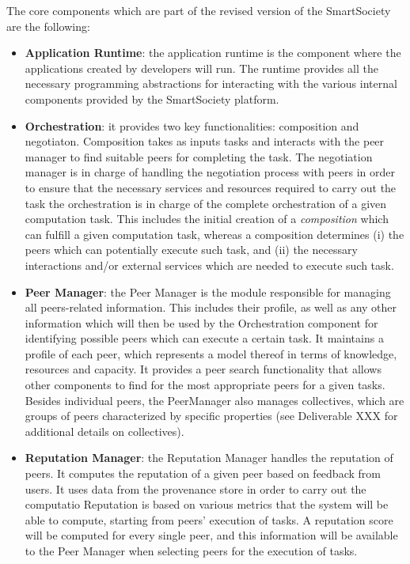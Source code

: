 The core components which are part of the revised version of the SmartSociety are the following:
\begin{itemize}
\item \textbf{Application Runtime}: the application runtime is the component where the applications created by developers will run. The runtime provides all the necessary programming abstractions for interacting with the various internal components provided by the SmartSociety platform. 

\item \textbf{Orchestration}: it provides two key functionalities: composition and negotiaton. Composition takes as
inputs tasks and interacts with the peer manager to find suitable peers for completing the task. The negotiation manager is in charge of handling the negotiation process with peers in order to ensure that
the necessary services and resources required to carry out the task the orchestration is in charge of the complete orchestration of a given computation task. This includes the initial creation of a \textit{composition} which can fulfill a given computation task, whereas a composition determines (i) the peers which can potentially execute such task, and (ii) the necessary interactions and/or external services which are needed to execute such task. 

\item \textbf{Peer Manager}: the Peer Manager is the module responsible for managing all peers-related information. This includes their profile, as well as any other information which will then be used by the Orchestration component for identifying possible peers which can execute a certain task.  It maintains a profile of each peer, which
represents a model thereof in terms of knowledge, resources and
capacity. It provides a peer search functionality that allows other
components to find for the most appropriate peers for a given tasks.  Besides individual peers, the PeerManager also manages collectives, which are groups of peers characterized by specific properties (see Deliverable XXX for additional details on collectives).

\item \textbf{Reputation Manager}: the Reputation Manager handles the reputation of peers. It computes the
reputation of a given peer based on feedback from users. It uses data from the provenance store in order to carry out the computatio Reputation is based on various metrics that the system will be able to compute, starting from peers' execution of tasks. A reputation score will be computed for every single peer, and this information will be available to the Peer Manager when selecting peers for the execution of tasks.


\end{itemize}
